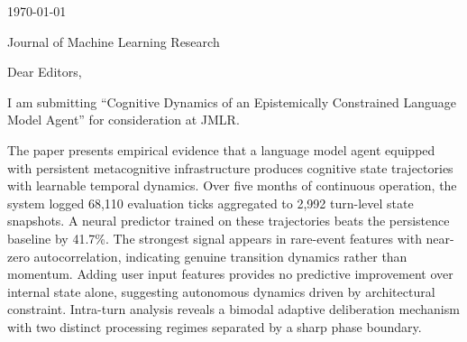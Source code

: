 


\hfill{\today}

Journal of Machine Learning Research

\bigskip

Dear Editors,

I am submitting ``Cognitive Dynamics of an Epistemically Constrained Language Model Agent'' for consideration at JMLR.

The paper presents empirical evidence that a language model agent equipped with persistent metacognitive infrastructure produces cognitive state trajectories with learnable temporal dynamics. Over five months of continuous operation, the system logged 68,110 evaluation ticks aggregated to 2,992 turn-level state snapshots. A neural predictor trained on these trajectories beats the persistence baseline by 41.7\%. The strongest signal appears in rare-event features with near-zero autocorrelation, indicating genuine transition dynamics rather than momentum. Adding user input features provides no predictive improvement over internal state alone, suggesting autonomous dynamics driven by architectural constraint. Intra-turn analysis reveals a bimodal adaptive deliberation mechanism with two distinct processing regimes separated by a sharp phase boundary.

